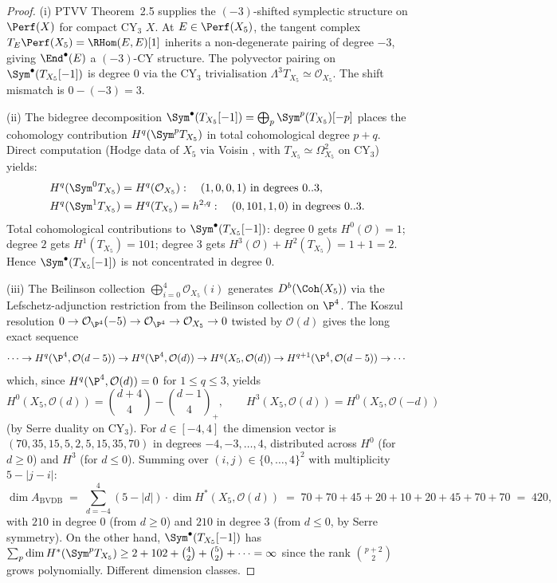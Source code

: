\begin{proof}
(i) PTVV \cite{PTVV2013} Theorem~2.5 supplies the $(-3)$-shifted symplectic
structure on $\Perf(X)$ for compact CY$_3$ $X$. At $E\in \Perf(X_5)$, the
tangent complex $T_E\Perf(X_5) = \RHom(E,E)[1]$ inherits a non-degenerate
pairing of degree $-3$, giving $\End^\bullet(E)$ a $(-3)$-CY structure.
The polyvector pairing on $\Sym^\bullet(T_{X_5}[-1])$ is degree $0$ via
the $\mathrm{CY}_3$ trivialisation $\Lambda^3 T_{X_5}\simeq \mathcal{O}_{X_5}$.
The shift mismatch is $0 - (-3) = 3$.

(ii) The bidegree decomposition $\Sym^\bullet(T_{X_5}[-1]) =
\bigoplus_p \Sym^p(T_{X_5})[-p]$ places the cohomology contribution
$H^q(\Sym^p T_{X_5})$ in total cohomological degree $p+q$. Direct
computation (Hodge data of $X_5$ via Voisin \cite{Voisin2003ii}, with
$T_{X_5}\simeq \Omega^2_{X_5}$ on $\mathrm{CY}_3$) yields:
\begin{align*}
 H^q(\Sym^0 T_{X_5}) &= H^q(\mathcal{O}_{X_5}): \quad
 (1,0,0,1) \text{ in degrees } 0..3, \\
 H^q(\Sym^1 T_{X_5}) &= H^q(T_{X_5}) = h^{2,q}: \quad
 (0,101,1,0) \text{ in degrees } 0..3.
\end{align*}
Total cohomological contributions to $\Sym^\bullet(T_{X_5}[-1])$:
degree $0$ gets $H^0(\mathcal{O}) = 1$;
degree $2$ gets $H^1(T_{X_5}) = 101$;
degree $3$ gets $H^3(\mathcal{O}) + H^2(T_{X_5}) = 1+1 = 2$.
Hence $\Sym^\bullet(T_{X_5}[-1])$ is not concentrated in degree $0$.

(iii) The Beilinson collection $\bigoplus_{i=0}^4 \mathcal{O}_{X_5}(i)$
generates $D^b(\Coh(X_5))$ via the Lefschetz-adjunction restriction from
the Beilinson collection on $\P^4$. The Koszul resolution
$0 \to \mathcal{O}_{\P^4}(-5) \to \mathcal{O}_{\P^4} \to \mathcal{O}_{X_5} \to 0$
twisted by $\mathcal{O}(d)$ gives the long exact sequence
\[
 \cdots \to H^q(\P^4, \mathcal{O}(d-5)) \to H^q(\P^4, \mathcal{O}(d))
 \to H^q(X_5, \mathcal{O}(d)) \to H^{q+1}(\P^4, \mathcal{O}(d-5)) \to \cdots
\]
which, since $H^q(\P^4, \mathcal{O}(d)) = 0$ for $1\leq q\leq 3$, yields
\[
 H^0(X_5, \mathcal{O}(d)) = \binom{d+4}{4} - \binom{d-1}{4}_{+},
 \qquad
 H^3(X_5, \mathcal{O}(d)) = H^0(X_5, \mathcal{O}(-d))
\]
(by Serre duality on CY$_3$). For $d\in [-4, 4]$ the dimension vector is
$(70, 35, 15, 5, 2, 5, 15, 35, 70)$ in degrees $-4, -3, \ldots, 4$,
distributed across $H^0$ (for $d\geq 0$) and $H^3$ (for $d\leq 0$).
Summing over $(i,j)\in\{0,\ldots,4\}^2$ with multiplicity $5 - |j-i|$:
\[
 \dim A_{\mathrm{BVDB}}
 \;=\; \sum_{d=-4}^{4} (5 - |d|) \cdot \dim H^*(X_5, \mathcal{O}(d))
 \;=\; 70\!+\!70\!+\!45\!+\!20\!+\!10\!+\!20\!+\!45\!+\!70\!+\!70 \;=\; 420,
\]
with $210$ in degree $0$ (from $d\geq 0$) and $210$ in degree $3$ (from
$d\leq 0$, by Serre symmetry). On the other hand, $\Sym^\bullet(T_{X_5}[-1])$
has $\sum_p \dim H^*(\Sym^p T_{X_5}) \geq 2 + 102 + \binom{4}{2} +
\binom{5}{2} + \cdots = \infty$ since the rank $\binom{p+2}{2}$ grows
polynomially. Different dimension classes.


\end{proof}
